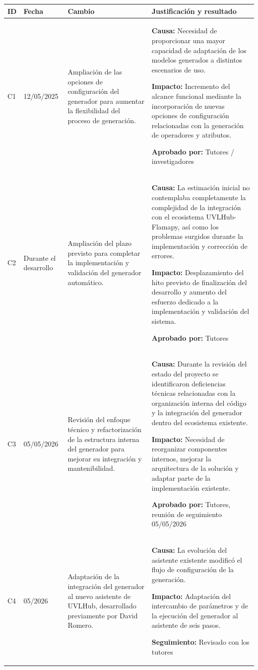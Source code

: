 \begin{longtable}{@{}P{0.8cm} P{2.5cm} P{4.0cm} P{\dimexpr\textwidth-7.3cm-6\tabcolsep\relax}@{}}
\toprule
\textbf{ID} & \textbf{Fecha} & \textbf{Cambio} & \textbf{Justificación y resultado} \\
\midrule
\endhead

C1 &
12/05/2025 &
Ampliación de las opciones de configuración del generador para aumentar la flexibilidad del proceso de generación. &
\textbf{Causa:} Necesidad de proporcionar una mayor capacidad de adaptación de los modelos generados a distintos escenarios de uso.\par\textbf{Impacto:} Incremento del alcance funcional mediante la incorporación de nuevas opciones de configuración relacionadas con la generación de operadores y atributos.\par\textbf{Aprobado por:} Tutores / investigadores \\

C2 &
Durante el desarrollo &
Ampliación del plazo previsto para completar la implementación y validación del generador automático. &
\textbf{Causa:} La estimación inicial no contemplaba completamente la complejidad de la integración con el ecosistema UVLHub-Flamapy, así como los problemas surgidos durante la implementación y corrección de errores.\par\textbf{Impacto:} Desplazamiento del hito previsto de finalización del desarrollo y aumento del esfuerzo dedicado a la implementación y validación del sistema.\par\textbf{Aprobado por:} Tutores \\

C3 &
05/05/2026 &
Revisión del enfoque técnico y refactorización de la estructura interna del generador para mejorar su integración y mantenibilidad. &
\textbf{Causa:} Durante la revisión del estado del proyecto se identificaron deficiencias técnicas relacionadas con la organización interna del código y la integración del generador dentro del ecosistema existente.\par\textbf{Impacto:} Necesidad de reorganizar componentes internos, mejorar la arquitectura de la solución y adaptar parte de la implementación existente.\par\textbf{Aprobado por:} Tutores, reunión de seguimiento 05/05/2026 \\

C4 &
05/2026 &
Adaptación de la integración del generador al nuevo asistente de UVLHub,
desarrollado previamente por David Romero. &
\textbf{Causa:} La evolución del asistente existente modificó el flujo
de configuración de la generación.\par
\textbf{Impacto:} Adaptación del intercambio de parámetros y de la
ejecución del generador al asistente de seis pasos.\par
\textbf{Seguimiento:} Revisado con los tutores \\


\end{longtable}
